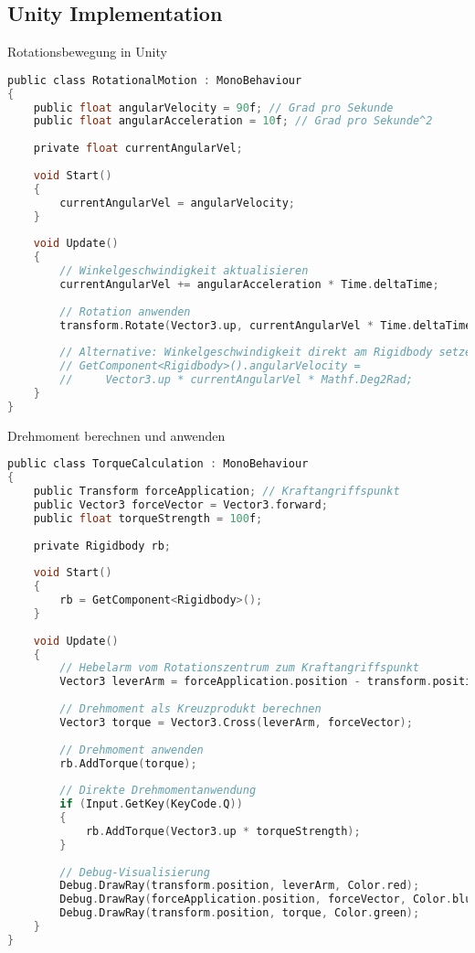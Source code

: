 \subsection{Unity Implementation}

\begin{code}{Rotationsbewegung in Unity}
\begin{lstlisting}[language=C, style=basesmol]
public class RotationalMotion : MonoBehaviour 
{
    public float angularVelocity = 90f; // Grad pro Sekunde
    public float angularAcceleration = 10f; // Grad pro Sekunde^2
    
    private float currentAngularVel;
    
    void Start() 
    {
        currentAngularVel = angularVelocity;
    }
    
    void Update() 
    {
        // Winkelgeschwindigkeit aktualisieren
        currentAngularVel += angularAcceleration * Time.deltaTime;
        
        // Rotation anwenden
        transform.Rotate(Vector3.up, currentAngularVel * Time.deltaTime);
        
        // Alternative: Winkelgeschwindigkeit direkt am Rigidbody setzen
        // GetComponent<Rigidbody>().angularVelocity = 
        //     Vector3.up * currentAngularVel * Mathf.Deg2Rad;
    }
}
\end{lstlisting}
\end{code}

\begin{code}{Drehmoment berechnen und anwenden}
\begin{lstlisting}[language=C, style=basesmol]
public class TorqueCalculation : MonoBehaviour 
{
    public Transform forceApplication; // Kraftangriffspunkt
    public Vector3 forceVector = Vector3.forward;
    public float torqueStrength = 100f;
    
    private Rigidbody rb;
    
    void Start() 
    {
        rb = GetComponent<Rigidbody>();
    }
    
    void Update() 
    {
        // Hebelarm vom Rotationszentrum zum Kraftangriffspunkt
        Vector3 leverArm = forceApplication.position - transform.position;
        
        // Drehmoment als Kreuzprodukt berechnen
        Vector3 torque = Vector3.Cross(leverArm, forceVector);
        
        // Drehmoment anwenden
        rb.AddTorque(torque);
        
        // Direkte Drehmomentanwendung
        if (Input.GetKey(KeyCode.Q)) 
        {
            rb.AddTorque(Vector3.up * torqueStrength);
        }
        
        // Debug-Visualisierung
        Debug.DrawRay(transform.position, leverArm, Color.red);
        Debug.DrawRay(forceApplication.position, forceVector, Color.blue);
        Debug.DrawRay(transform.position, torque, Color.green);
    }
}
\end{lstlisting}
\end{code}

